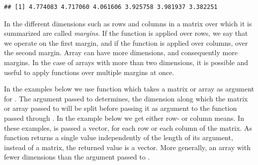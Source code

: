 \documentclass[krantz2]{krantz}\usepackage{knitr}%
\begin{document}
\begin{knitrout}\footnotesize
{}\color{fgcolor}\begin{kframe}
\begin{alltt}
 \hlopt{+} 
\end{alltt}
\begin{verbatim}
## [1] 4.774083 4.717060 4.061606 3.925758 3.981937 3.382251
\end{verbatim}
\end{kframe}
\end{knitrout}

\begin{warningbox}
In \Rlang the different dimensions such as rows and columns in a matrix over which it is summarized are called \emph{margins}. If the function is applied over rows, we say that we operate on the first margin, and if the function is applied over columns, over the second margin. Array can have more dimensions, and consequently more margins. In the case of arrays with more than two dimensions, it is possible and useful to apply functions over multiple margins at once.
\end{warningbox}

In the examples below we use function  which takes a matrix or array as argument for . The argument passed to  determines, the dimension along which the matrix or array passed to  will be split before passing it as argument to the function passed through . In the example below we get either row- or column means. In these examples,  is passed a vector, for each row or each column of the matrix. As function  returns a single value independently of the length of its argument, instead of a matrix, the returned value is a vector. More generally, an array with fewer dimensions than the argument passed to .
\end{document}
